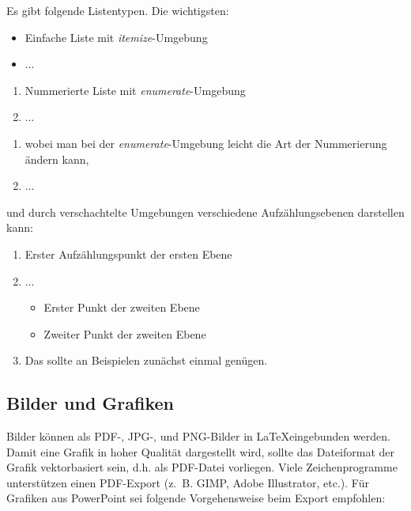 Es gibt folgende Listentypen. Die wichtigsten:

\begin{itemize}
	\item Einfache Liste mit \textit{itemize}-Umgebung
	\item ...
\end{itemize}

\begin{enumerate}
	\item Nummerierte Liste mit \textit{enumerate}-Umgebung
	\item ...
\end{enumerate}

\begin{enumerate}[label=\alph*.]
	\item wobei man bei der \textit{enumerate}-Umgebung leicht die Art der Nummerierung ändern kann,
	\item ...
\end{enumerate}

und durch verschachtelte Umgebungen verschiedene Aufzählungsebenen darstellen kann:

\begin{enumerate}[label=\alph*)]
	\item Erster Aufzählungspunkt der ersten Ebene
	\item ...
	\begin{itemize}
		\item Erster Punkt der zweiten Ebene
		\item Zweiter Punkt der zweiten Ebene
	\end{itemize}
	\item Das sollte an Beispielen zunächst einmal genügen.
\end{enumerate}

\clearpage

\subsection{Bilder und Grafiken}

Bilder können als PDF-, JPG-, und PNG-Bilder in \LaTeX eingebunden werden. Damit eine Grafik in hoher Qualität dargestellt wird, sollte das Dateiformat der Grafik vektorbasiert sein, d.h. als PDF-Datei vorliegen. Viele Zeichenprogramme unterstützen einen PDF-Export (z.~B. GIMP, Adobe Illustrator, etc.). Für Grafiken aus PowerPoint sei folgende Vorgehensweise beim Export empfohlen:

